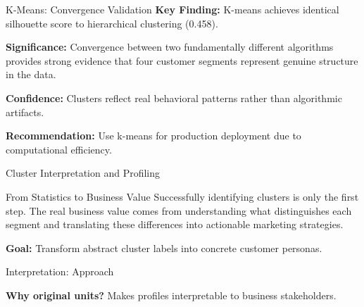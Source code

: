 \documentclass[aspectratio=169,ignorenonframetext]{beamer}
\begin{document}
\begin{frame}{K-Means: Convergence Validation}
\textbf{Key Finding:} K-means achieves identical silhouette score to
hierarchical clustering (0.458).

\textbf{Significance:} Convergence between two fundamentally different
algorithms provides strong evidence that four customer segments
represent genuine structure in the data.

\textbf{Confidence:} Clusters reflect real behavioral patterns rather
than algorithmic artifacts.

\textbf{Recommendation:} Use k-means for production deployment due to
computational efficiency.
\end{frame}

\begin{frame}{Cluster Interpretation and Profiling}
\begin{block}{From Statistics to Business Value}
Successfully identifying clusters is only the first step. The real
business value comes from understanding what distinguishes each segment
and translating these differences into actionable marketing strategies.

\textbf{Goal:} Transform abstract cluster labels into concrete customer
personas.
\end{block}
\end{frame}

\begin{frame}[fragile]{Interpretation: Approach}
\begin{Shaded}
\begin{Highlighting}[]
\OperatorTok{=}
\NormalTok{df\_with\_clusters[}\NormalTok{] }\OperatorTok{=}

\OperatorTok{=}

\OperatorTok{=}\NormalTok{)}
\end{Highlighting}
\end{Shaded}

\textbf{Why original units?} Makes profiles interpretable to business
stakeholders.
\end{frame}
\end{document}

